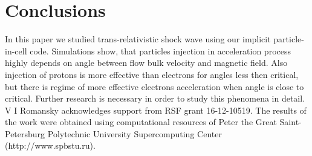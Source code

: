 \section{Conclusions}
In this paper we studied trans-relativistic shock wave using our implicit particle-in-cell code. Simulations show, that particles injection in acceleration process highly depends on angle between flow bulk velocity and magnetic field. Also injection of protons is more effective than electrons for angles less then critical, but there is regime of more effective electrons acceleration when angle is close to critical. Further research is necessary in order to study this phenomena in detail.
\ack
V I Romansky acknowledges support from RSF grant 16-12-10519.
The results of the work were obtained using computational resources of Peter the Great Saint-Petersburg Polytechnic University Supercomputing Center (http://www.spbstu.ru).